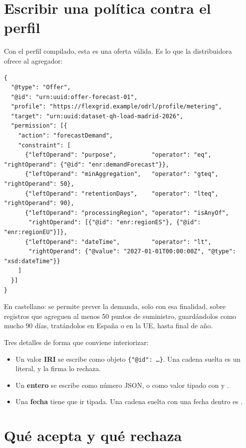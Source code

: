 \section{Escribir una política contra el perfil}

Con el perfil compilado, esta es una oferta válida. Es lo que la distribuidora ofrece al agregador:

\begin{lstlisting}[style=json]
{
  "@type": "Offer",
  "@id": "urn:uuid:offer-forecast-01",
  "profile": "https://flexgrid.example/odrl/profile/metering",
  "target": "urn:uuid:dataset-qh-load-madrid-2026",
  "permission": [{
    "action": "forecastDemand",
    "constraint": [
      {"leftOperand": "purpose",          "operator": "eq",      "rightOperand": {"@id": "enr:demandForecast"}},
      {"leftOperand": "minAggregation",   "operator": "gteq",    "rightOperand": 50},
      {"leftOperand": "retentionDays",    "operator": "lteq",    "rightOperand": 90},
      {"leftOperand": "processingRegion", "operator": "isAnyOf",
       "rightOperand": [{"@id": "enr:regionES"}, {"@id": "enr:regionEU"}]},
      {"leftOperand": "dateTime",         "operator": "lt",
       "rightOperand": {"@value": "2027-01-01T00:00:00Z", "@type": "xsd:dateTime"}}
    ]
  }]
}
\end{lstlisting}

En castellano: se permite prever la demanda, solo con esa finalidad, sobre registros que agreguen al menos 50
puntos de suministro, guardándolos como mucho 90 días, tratándolos en España o en la UE, hasta final de año.

Tres detalles de forma que conviene interiorizar:

\begin{itemize}[leftmargin=*, itemsep=2pt]
  \item Un valor \textbf{IRI} se escribe como objeto \texttt{\{"@id": …\}}. Una cadena suelta es un literal, y la
        firma lo rechaza.
  \item Un \textbf{entero} se escribe como número JSON, o como valor tipado con  y .
  \item Una \textbf{fecha} tiene que ir tipada. Una cadena suelta con una fecha dentro es .
\end{itemize}

\section{Qué acepta y qué rechaza}
\label{sec:tabla-ofertas}

